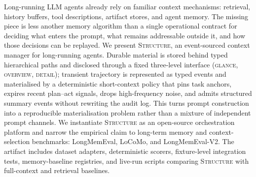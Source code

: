 Long-running LLM agents already rely on familiar context mechanisms:
retrieval, history buffers, tool descriptions, artifact stores, and
agent memory. The missing piece is less another memory algorithm than a
single operational contract for deciding what enters the prompt, what
remains addressable outside it, and how those decisions can be replayed.
We present \textsc{Structure}, an event-sourced context manager for
long-running agents. Durable material is stored behind typed
hierarchical paths and disclosed through a fixed three-level interface
(\textsc{glance}, \textsc{overview}, \textsc{detail}); transient
trajectory is represented as typed events and materialised by a
deterministic short-context policy that pins task anchors, expires
recent plan--act signals, drops high-frequency noise, and admits
structured summary events without rewriting the audit log. This turns
prompt construction into a reproducible materialisation problem rather
than a mixture of independent prompt channels. We instantiate
\textsc{Structure} as an open-source orchestration platform and narrow
the empirical claim to long-term memory and context-selection
benchmarks: LongMemEval, LoCoMo, and LongMemEval-V2. The artifact
includes dataset adapters, deterministic scorers, fixture-level
integration tests, memory-baseline registries, and live-run scripts
comparing \textsc{Structure} with full-context and retrieval baselines.
